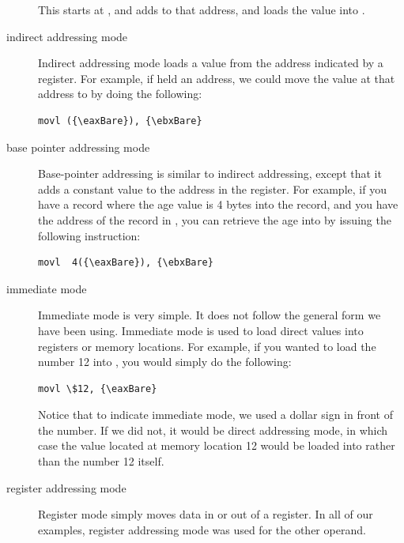 \begin{description}
This starts at , and adds  to that address, and loads the value into {\eaxReg}.
\item[indirect addressing mode\index{indirect addressing mode}] Indirect addressing mode loads a value from the address indicated by a register.  For example, if {\eaxReg} held an address, we could move the value at that
address to {\ebxReg} by doing the following:
\begin{simpletyping}
\begin{lstlisting}
movl ({\eaxBare}), {\ebxBare}
\end{lstlisting}
\end{simpletyping}
\item[base pointer addressing mode\index{base pointer addressing mode}] Base-pointer addressing is similar to indirect addressing, except that it
adds a constant value to the address in the register.  For example, if you
have a record where the age value is 4 bytes into the record, and you have the
address of the record in {\eaxReg}, you can retrieve the age into {\ebxReg} by 
issuing the following instruction:
\begin{simpletyping}
\begin{lstlisting}
movl  4({\eaxBare}), {\ebxBare}
\end{lstlisting}
\end{simpletyping}
\item[immediate mode\index{immediate mode addressing}] Immediate mode is very simple.  It does not follow the general form we have
been using.  Immediate mode is used to load direct values into registers
or memory locations.  For example, if you wanted to load the number 12
into {\eaxReg}, you would simply do the following:
\begin{simpletyping}
\begin{lstlisting}
movl \$12, {\eaxBare}
\end{lstlisting}
\end{simpletyping}

Notice that to indicate immediate mode, we used a dollar sign in front of
the number.  If we did not, it would be direct addressing mode, in which 
case the value located at memory location 12 would be loaded into {\eaxReg}
rather than the number 12 itself.
\item[register addressing mode\index{register addressing mode}] Register mode simply moves data in or out of a register.  In all of our 
examples, register addressing mode was used for the other operand.
\end{description}

